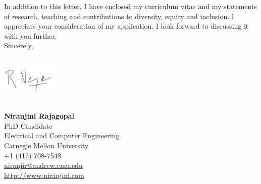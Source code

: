 \documentclass[11mpt]{article}
\begin{document}
In addition to this letter, I have enclosed my curriculum vitae and my statements of research, teaching and contributions to diversity, equity and inclusion. I appreciate your consideration of my application. I look forward to discussing it with you further. \\

Sincerely,\\\\
\begin{minipage}[t!]{\textwidth}
\includegraphics[width=1in]{Sign.png}%
\end{minipage}\\

\textbf{Niranjini Rajagopal}\\
PhD Candidate\\
Electrical and Computer Engineering\\
Carnegie Mellon University\\
+1 (412) 708-7548 \\%
\href{mailto:niranjir@andrew.cmu.edu}{niranjir@andrew.cmu.edu}\\%
\href{http://www.niranjini.com}{http://www.niranjini.com} 

\end{document}
